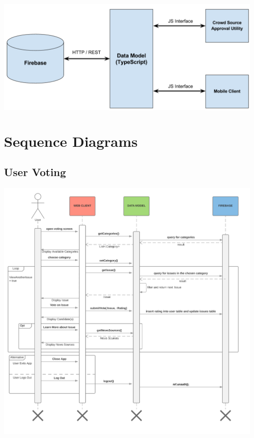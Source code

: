 \documentclass[11pt]{article}
\begin{document}
\begin{centering}
\includegraphics[width = \textwidth]{backend_model.png}

\end{centering}

\newpage

\section{Sequence Diagrams}

\subsection{User Voting}

\begin{centering}
\includegraphics[width = 0.7\textheight]{sonja.png}

\end{centering}
\end{document}
